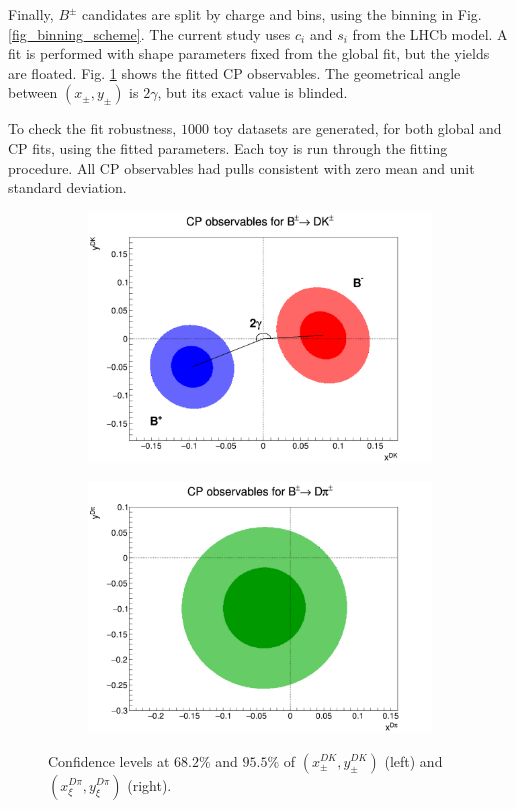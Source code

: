 \documentclass[12pt, a4paper, notitlepage, onecolumn]{article}
\begin{document}
Finally, $B^\pm$ candidates are split by charge and bins, using the binning in Fig. \ref{fig_binning_scheme}. The current study uses $c_i$ and $s_i$ from the LHCb model. A fit is performed with shape parameters fixed from the global fit, but the yields are floated. Fig. \ref{fig_cp_observables} shows the fitted CP observables. The geometrical angle between $(x_\pm, y_\pm)$ is $2\gamma$, but its exact value is blinded.

To check the fit robustness, $1000$ toy datasets are generated, for both global and CP fits, using the fitted parameters. Each toy is run through the fitting procedure. All CP observables had pulls consistent with zero mean and unit standard deviation.

\begin{figure}[H] 
  \centering
  \begin{subfigure}{0.50\textwidth}
    \centering
    \includegraphics[width=1\textwidth]{Plots/CPContours.png}
  \end{subfigure}%
  \begin{subfigure}{0.50\textwidth}
    \centering
    \includegraphics[width=1\textwidth]{Plots/CPXiContours.png}
  \end{subfigure}
  \caption{Confidence levels at $68.2\%$ and $95.5\%$ of $(x_\pm^{DK}, y_\pm^{DK})$ (left) and $(x_\xi^{D\pi}, y_\xi^{D\pi})$ (right).}
  \label{fig_cp_observables}
\end{figure}
\end{document}

